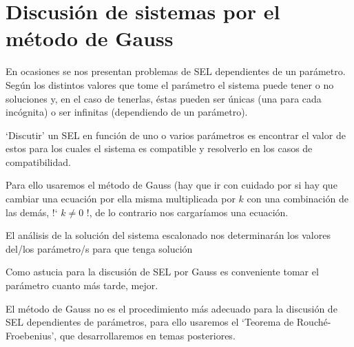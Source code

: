 \section[Discusión de sistemas por el método de Gauss]{Discusión de sistemas por el método de Gauss}

En ocasiones se nos presentan problemas de SEL dependientes de un parámetro. Según los distintos valores que tome el parámetro el sistema puede tener o no soluciones y, en el caso de tenerlas, éstas pueden ser únicas (una para cada incógnita) o ser infinitas (dependiendo de un parámetro). 

\begin{defi}
`Discutir' un SEL en función de uno o varios parámetros es encontrar el valor de estos para los cuales el sistema es compatible y resolverlo en los casos de compatibilidad.

Para ello usaremos el método de Gauss (hay que ir con cuidado por si  hay que cambiar una ecuación por ella misma multiplicada por $k$ con una combinación de las demás, !` $k\neq 0$ !, de lo contrario nos cargaríamos una ecuación.

El análisis de la solución del sistema escalonado nos determinarán los valores del/los parámetro/s para que tenga solución
\end{defi}

 Como astucia para la discusión de SEL por Gauss es conveniente tomar el parámetro cuanto más tarde, mejor.

El método de Gauss no es el procedimiento más adecuado para la discusión de SEL dependientes de parámetros, para ello usaremos el `Teorema de Rouché-Froebenius', que desarrollaremos en temas posteriores.

